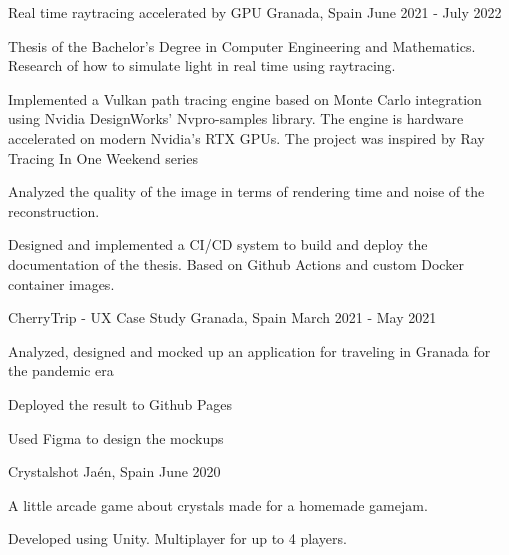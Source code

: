 
\begin{cventries}
    \cventry
      {}
      {Real time raytracing accelerated by GPU}
      {Granada, Spain}
      {June 2021 - July 2022}
      {
        \begin{cvitems} %
          \item {Thesis of the Bachelor's Degree in Computer Engineering and Mathematics. Research of how to simulate light in real time using raytracing.}
          \item {Implemented a Vulkan path tracing engine based on Monte Carlo integration using Nvidia DesignWorks' Nvpro-samples library. The engine is hardware accelerated on modern Nvidia's RTX GPUs. The project was inspired by Ray Tracing In One Weekend series}
          \item {Analyzed the quality of the image in terms of rendering time and noise of the reconstruction.}
          \item {Designed and implemented a CI/CD system to build and deploy the documentation of the thesis. Based on Github Actions and custom Docker container images.}
        \end{cvitems}
      }

    \cventry
      {}
      {CherryTrip - UX Case Study}
      {Granada, Spain}
      {March 2021 - May 2021}
      {
        \begin{cvitems} %
          \item {Analyzed, designed and mocked up an application for traveling in Granada for the pandemic era }
          \item {Deployed the result to Github Pages}
          \item {Used Figma to design the mockups}
        \end{cvitems}
      }

    \cventry
      {}
      {Crystalshot}
      {Jaén, Spain}
      {June 2020}
      {
        \begin{cvitems} %
          \item {A little arcade game about crystals made for a homemade gamejam.}
          \item {Developed using Unity. Multiplayer for up to 4 players.}
        \end{cvitems}
      }
\end{cventries}